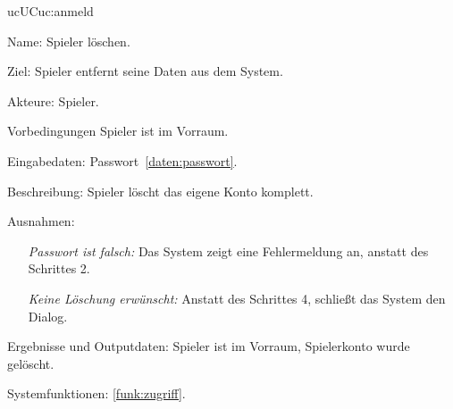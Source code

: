 \begin{description}[leftmargin=5em, style=sameline]
	\begin{lhp}{uc}{UC}{uc:anmeld}
		\item [Name:] Spieler löschen.
		\item [Ziel:] Spieler entfernt seine Daten aus dem System.
		\item [Akteure:] Spieler.
		\item [Vorbedingungen] Spieler ist im Vorraum.
		\item [Eingabedaten:] Passwort~\ref{daten:passwort}.
		\item [Beschreibung:] Spieler löscht das eigene Konto komplett.
		\item [Ausnahmen:] \hfill
			\begin{itemize} 
				\item[] \textit{Passwort ist falsch:} Das System zeigt eine Fehlermeldung an, anstatt des Schrittes 2.
				\item[] \textit{Keine Löschung erwünscht:} Anstatt des Schrittes 4, schließt das System den Dialog.
				
			\end{itemize}
		\item [Ergebnisse und Outputdaten:] Spieler ist im Vorraum, Spielerkonto wurde gelöscht.	
		\item [Systemfunktionen:] \ref{funk:zugriff}.
	\end{lhp}

\end{description}